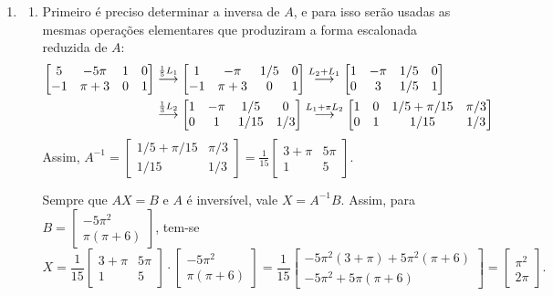 \documentclass[12pt,a4paper]{article}
\newcommand{\grstep}[2][\relax]{%
   \ensuremath{\mathrel{
       {\mathop{\longrightarrow}\limits^{#2\mathstrut}_{
                                     \begin{subarray}{l} #1 \end{subarray}}}}}}
\begin{document}
\begin{enumerate}
\item
\begin{enumerate}
\item Primeiro é preciso determinar a inversa de $A$, e para isso serão usadas as mesmas operações elementares que produziram a forma escalonada reduzida de $A$:
\begin{align*}
\begin{bmatrix}
 5 & -5\pi & 1 & 0\\
-1 & \pi+3 & 0 & 1
\end{bmatrix}
&
\grstep{ \frac{1}{5} L_1 }
\begin{bmatrix}
 1 & -\pi & 1/5 & 0 \\
-1 & \pi+3 & 0 & 1
\end{bmatrix}
\grstep{ L_2 + L_1 }
\begin{bmatrix}
1 & -\pi & 1/5 & 0 \\
0 &    3 & 1/5 & 1
\end{bmatrix} \\
&
\grstep{ \frac{1}{3} L_2 }
\begin{bmatrix}
1 & -\pi & 1/5 & 0 \\
0 &    1 & 1/15 & 1/3
\end{bmatrix}
\grstep{ L_1 + \pi L_2 }
\begin{bmatrix}
1 & 0 & 1/5 + \pi/15 & \pi/3 \\
0 & 1 &         1/15 & 1/3
\end{bmatrix}
\end{align*}
Assim, $A^{-1} =
\begin{bmatrix}
1/5 + \pi/15 & \pi/3 \\
        1/15 & 1/3
\end{bmatrix}
=
\frac{1}{15}
\begin{bmatrix}
3 + \pi & 5\pi \\
1       & 5
\end{bmatrix}.$

Sempre que $A X = B$ e $A$ é inversível, vale $X = A^{-1} B$. Assim, para $B = \begin{bmatrix}
-5\pi^2 \\
\pi(\pi+6)
\end{bmatrix}$, tem-se
\[
X
=
\frac{1}{15}
\begin{bmatrix}
3 + \pi & 5\pi \\
1       & 5
\end{bmatrix}
\cdot 
\begin{bmatrix}
-5\pi^2 \\
\pi(\pi+6)
\end{bmatrix}
=
\frac{1}{15}
\begin{bmatrix}
-5\pi^2(3 + \pi) + 5\pi^2(\pi+6) \\
-5\pi^2 + 5\pi(\pi+6)
\end{bmatrix}
=
\begin{bmatrix}
\pi^2 \\
2 \pi
\end{bmatrix}.
\]


\end{enumerate}
\end{enumerate}
\end{document}
